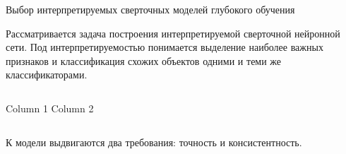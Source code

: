\documentclass{beamer}
\begin{document}
\begin{frame}{Выбор интерпретируемых сверточных моделей глубокого обучения}

Рассматривается задача построения интерпретируемой сверточной нейронной сети. Под интерпретируемостью понимается выделение наиболее важных признаков и классификация схожих объектов одними и теми же классификаторами.

\begin{columns}[c]
    Column 1
    Column 2
\end{columns}

\bigskip
К модели выдвигаются два требования: {\color{red}точность} и {\color{red}консистентность}.
\end{frame}
\end{document}
